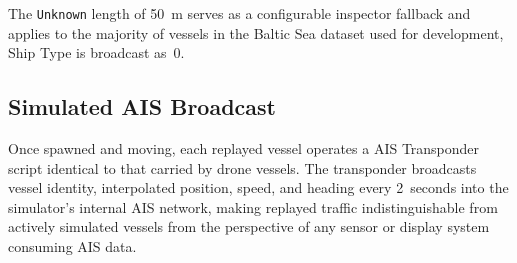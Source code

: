\noindent The \texttt{Unknown} length of 50~m serves as a configurable inspector fallback and applies to the majority of vessels in the Baltic Sea dataset used for development, Ship Type is broadcast as~0.

\subsection{Simulated AIS Broadcast}

Once spawned and moving, each replayed vessel operates a AIS Transponder script identical to that carried by drone vessels. The transponder broadcasts vessel identity, interpolated position, speed, and heading every 2~seconds into the simulator's internal AIS network, making replayed traffic indistinguishable from actively simulated vessels from the perspective of any sensor or display system consuming AIS data.